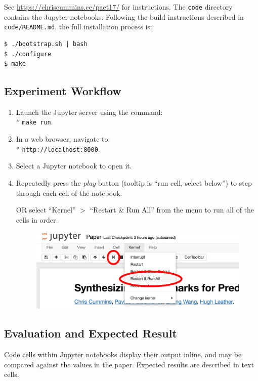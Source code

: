 See \url{https://chriscummins.cc/pact17/} for instructions. The \texttt{code}
directory contains the Jupyter notebooks. Following the build instructions
described in \texttt{code/README.md}, the full installation process is:

\begin{verbatim}
$ ./bootstrap.sh | bash
$ ./configure
$ make
\end{verbatim}


\subsection{Experiment Workflow}\label{subsec:workflow}

\begin{enumerate}
  \item Launch the Jupyter server using the command:\\*
  \texttt{make run}.
  \item In a web browser, navigate to:\\* \texttt{http://localhost:8000}.
  \item Select a Jupyter notebook to open it.
  \item Repeatedly press the \emph{play} button (tooltip is ``run cell, select
    below'') to step through each cell of the notebook.

  OR select ``Kernel'' $>$ ``Restart \& Run All'' from the menu to run all of
  the cells in order.
  \begin{figure}[H]
    \includegraphics[width=\columnwidth]{img/jupyter}
  \end{figure}
\end{enumerate}


\subsection{Evaluation and Expected Result}

Code cells within Jupyter notebooks display their output inline, and may be
compared against the values in the paper. Expected results are described in text
cells.


